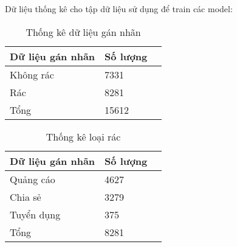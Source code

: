 Dữ liệu thống kê cho tập dữ liệu sử dụng để train các model:
	\begin{table}[H]
		\centering
		\setlength\extrarowheight{3pt}
		\begin{tabular}{|l|l|l|}
			\hline
			Dữ liệu gán nhãn & Số lượng \\
			\hline
			Không rác   & 7331\\
			\hline
			Rác   & 8281\\
			\hline
			\hline
			Tổng   & 15612\\
			\hline
		\end{tabular}%
		\caption{Thống kê dữ liệu gán nhãn} \label{tab:table_4_1}%
	\end{table}
	\begin{table}[H]
		\centering
		\setlength\extrarowheight{3pt}
		\begin{tabular}{|l|l|l|}
			\hline
			Dữ liệu gán nhãn & Số lượng \\
			\hline
			Quảng cáo   & 4627\\
			\hline
			Chia sẻ   & 3279\\
			\hline
			Tuyển dụng   & 375\\
			\hline
			\hline
			Tổng   & 8281\\
			\hline
		\end{tabular}%
		\caption{Thống kê loại rác} \label{tab:table_4_2}%
	\end{table}
